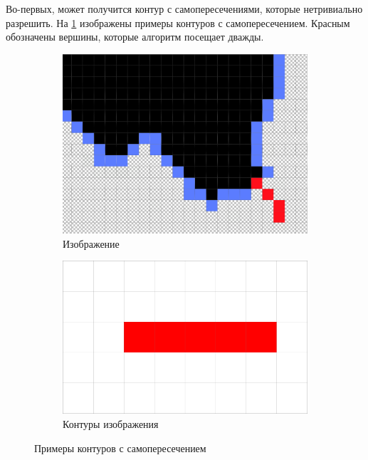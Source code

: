 \documentclass{fefu_thesis/cls/fefu}
\begin{document}
    Во-первых, может получится контур с самопересечениями, которые нетривиально разрешить. На \ref{SelfIntersectingContours} изображены примеры контуров с самопересечением. Красным обозначены вершины, которые алгоритм посещает дважды.
    \begin{figure}[H]
        \centering
        \begin{subfigure}[t]{.49\linewidth}
            \centering
            \includegraphics[scale=0.2]{images/SelfIntersectingContour1.png}
            \caption{Изображение}
        \end{subfigure}
        \begin{subfigure}[t]{.49\linewidth}
            \centering
            \includegraphics[scale=0.4]{images/SelfIntersectingContour2.png}
            \caption{Контуры изображения}
        \end{subfigure}
        \caption{Примеры контуров с самопересечением}
        \label{SelfIntersectingContours}
    \end{figure}
\end{document}
